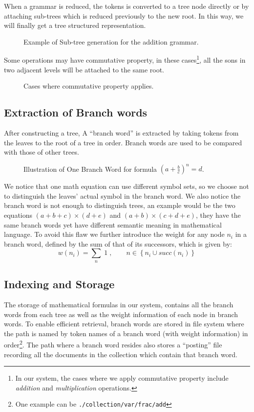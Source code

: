 \documentclass{acm_proc_article-sp}
\begin{document}
When a grammar is reduced, the tokens is converted to a tree node directly or by attaching sub-trees which is reduced previously to the new root. In this way, we will finally get a tree structured representation.

\begin{figure}
\caption{Example of Sub-tree generation for the addition grammar.}
\end{figure}

Some operations may have commutative property, in these cases\footnote{In our system, the cases where we apply commutative property include \textit{addition} and \textit{multiplication} operations.}, all the sons in two adjacent levels will be attached to the same root.

\begin{figure}
\caption{Cases where commutative property applies.}
\end{figure}

\subsection{Extraction of Branch words}
After constructing a tree, A ``branch word'' is extracted by taking tokens from the leaves to the root of a tree in order. Branch words are used to be compared with those of other trees. 

\begin{figure}
\centering
{}
\caption{Illustration of One Branch Word for formula $(a+\frac{b}{c})^n = d$.}
\end{figure}

We notice that one math equation can use different symbol sets, so we choose not to distinguish the leaves' actual symbol in the branch word. We also notice the branch word is not enough to distinguish trees, an example would be the two equations $(a + b + c)\times (d + e)$ and $(a + b) \times (c + d + e)$, they have the same branch words yet have different semantic meaning in mathematical language. To avoid this flaw we further introduce the weight for any node $n_i$ in a branch word, defined by the sum of that of its successors, which is given by:
$$
w(n_i) = \sum\limits_{n} \; 1 \;, \qquad n \in \left\{n_i \cup succ(n_i) \right\}
$$

\subsection{Indexing and Storage}
The storage of mathematical formulas in our system, contains all the branch words from each tree as well as the weight information of each node in branch words. To enable efficient retrieval, branch words are stored in file system where the path is named by token names of a branch word (with weight information) in order\footnote{One example can be \texttt{./collection/var/frac/add}}. The path where a branch word resides also stores a ``posting'' file recording all the documents in the collection which contain that branch word.
\end{document}
